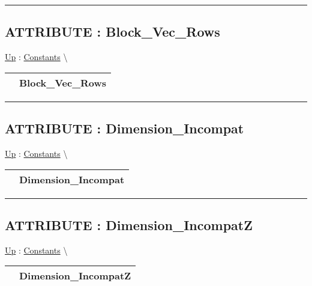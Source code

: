 \par


\rule{\linewidth}{0.5pt}
\subsection*{ATTRIBUTE : Block\_Vec\_Rows}
\hypertarget{ecldoc:pbblas.constants.block_vec_rows}{}
\hyperlink{ecldoc:PBblas.Constants}{Up} :
\hspace{0pt} \hyperlink{ecldoc:PBblas.Constants}{Constants} \textbackslash 

{\renewcommand{\arraystretch}{1.5}
\begin{tabularx}{\textwidth}{|>{\raggedright\arraybackslash}l|X|}
\hline
\hspace{0pt} & Block\_Vec\_Rows \\
\hline
\end{tabularx}
}

\par


\rule{\linewidth}{0.5pt}
\subsection*{ATTRIBUTE : Dimension\_Incompat}
\hypertarget{ecldoc:pbblas.constants.dimension_incompat}{}
\hyperlink{ecldoc:PBblas.Constants}{Up} :
\hspace{0pt} \hyperlink{ecldoc:PBblas.Constants}{Constants} \textbackslash 

{\renewcommand{\arraystretch}{1.5}
\begin{tabularx}{\textwidth}{|>{\raggedright\arraybackslash}l|X|}
\hline
\hspace{0pt} & Dimension\_Incompat \\
\hline
\end{tabularx}
}

\par


\rule{\linewidth}{0.5pt}
\subsection*{ATTRIBUTE : Dimension\_IncompatZ}
\hypertarget{ecldoc:pbblas.constants.dimension_incompatz}{}
\hyperlink{ecldoc:PBblas.Constants}{Up} :
\hspace{0pt} \hyperlink{ecldoc:PBblas.Constants}{Constants} \textbackslash 

{\renewcommand{\arraystretch}{1.5}
\begin{tabularx}{\textwidth}{|>{\raggedright\arraybackslash}l|X|}
\hline
\hspace{0pt} & Dimension\_IncompatZ \\
\hline
\end{tabularx}
}


